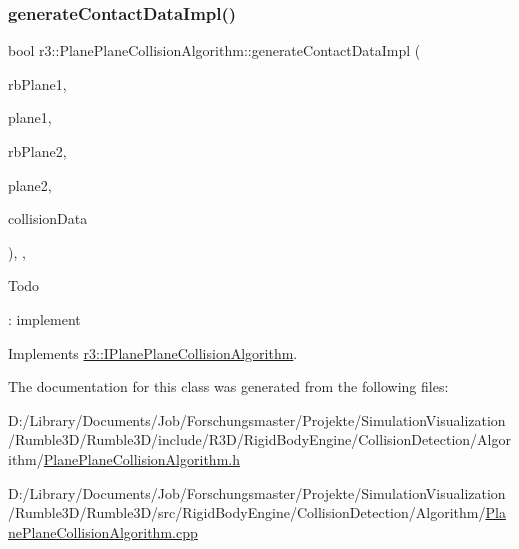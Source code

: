 \subsubsection{\texorpdfstring{generate\+Contact\+Data\+Impl()}{generateContactDataImpl()}}
{\footnotesize\ttfamily bool r3\+::\+Plane\+Plane\+Collision\+Algorithm\+::generate\+Contact\+Data\+Impl (\begin{DoxyParamCaption}\item[{\mbox{\hyperlink{classr3_1_1_rigid_body}{Rigid\+Body}} $\ast$}]{rb\+Plane1,  }\item[{\mbox{\hyperlink{classr3_1_1_collision_plane}{Collision\+Plane}} $\ast$}]{plane1,  }\item[{\mbox{\hyperlink{classr3_1_1_rigid_body}{Rigid\+Body}} $\ast$}]{rb\+Plane2,  }\item[{\mbox{\hyperlink{classr3_1_1_collision_plane}{Collision\+Plane}} $\ast$}]{plane2,  }\item[{\mbox{\hyperlink{classr3_1_1_collision_data}{Collision\+Data}} \&}]{collision\+Data }\end{DoxyParamCaption})\hspace{0.3cm}{\ttfamily [override]}, {\ttfamily [protected]}, {\ttfamily [virtual]}}

\begin{DoxyRefDesc}{Todo}
\item[\mbox{\hyperlink{todo__todo000009}{Todo}}]\+: implement \end{DoxyRefDesc}


Implements \mbox{\hyperlink{classr3_1_1_i_plane_plane_collision_algorithm_a708dec70f58b4476976dfea9921d1524}{r3\+::\+I\+Plane\+Plane\+Collision\+Algorithm}}.



The documentation for this class was generated from the following files\+:\begin{DoxyCompactItemize}
\item 
D\+:/\+Library/\+Documents/\+Job/\+Forschungsmaster/\+Projekte/\+Simulation\+Visualization/\+Rumble3\+D/\+Rumble3\+D/include/\+R3\+D/\+Rigid\+Body\+Engine/\+Collision\+Detection/\+Algorithm/\mbox{\hyperlink{_plane_plane_collision_algorithm_8h}{Plane\+Plane\+Collision\+Algorithm.\+h}}\item 
D\+:/\+Library/\+Documents/\+Job/\+Forschungsmaster/\+Projekte/\+Simulation\+Visualization/\+Rumble3\+D/\+Rumble3\+D/src/\+Rigid\+Body\+Engine/\+Collision\+Detection/\+Algorithm/\mbox{\hyperlink{_plane_plane_collision_algorithm_8cpp}{Plane\+Plane\+Collision\+Algorithm.\+cpp}}\end{DoxyCompactItemize}
